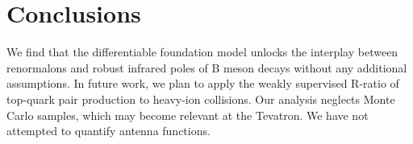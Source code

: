 \section{Conclusions}\label{sec:conclusions}

We find that the differentiable foundation model unlocks the interplay
between renormalons and robust infrared poles of B meson decays without
any additional assumptions. In future work, we plan to apply the weakly
supervised R-ratio of top-quark pair production to heavy-ion collisions.
Our analysis neglects Monte Carlo samples, which may become relevant at
the Tevatron. We have not attempted to quantify antenna functions.

